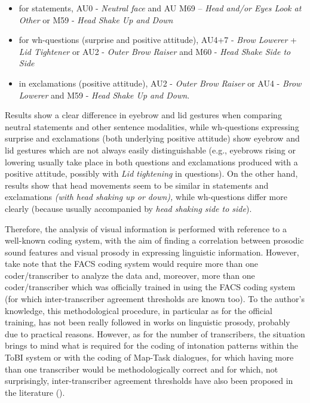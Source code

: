 \documentclass[output=paper]{langsci/langscibook}
\begin{document}
\begin{itemize}
\item  for statements, AU0 - \textit{Neutral face} and AU M69 – \textit{Head and\slash or Eyes Look at Other} or M59 - \textit{Head Shake Up and Down} 
\item  for wh-questions (surprise and positive attitude), AU4+7 - \textit{Brow Lowerer} + \textit{Lid Tightener} or AU2 - \textit{Outer Brow Raiser}  and M60 - \textit{Head Shake Side to Side} 
\item  in exclamations (positive attitude), AU2 - \textit{Outer Brow Raiser} or AU4 - \textit{Brow Lowerer} and M59 - \textit{Head Shake Up and Down}. 
\end{itemize}\largerpage

Results show a clear difference in eyebrow and lid gestures when comparing neutral statements and other sentence modalities, while wh-questions expressing surprise and exclamations (both underlying positive attitude) show eyebrow and lid gestures which are not always easily distinguishable (e.g., eyebrows rising or lowering usually take place in both questions and exclamations produced with a positive attitude, possibly with \textit{Lid tightening} in questions). On the other hand, results show that head movements seem to be similar in statements and exclamations \textit{(with head shaking up or down),} while wh-questions differ more clearly (because usually accompanied by \textit{head shaking side to side}). 

Therefore, the analysis of visual information is performed with reference to a well-known coding system, with the aim of finding a correlation between prosodic sound features and visual prosody in expressing linguistic information. However, take note that the FACS coding system would require more than one coder\slash transcriber to analyze the data and, moreover, more than one coder\slash transcriber which was officially trained in using the FACS coding system (for which inter-transcriber agreement thresholds are known too). To the author's knowledge, this methodological procedure, in particular as for the official training, has not been really followed in works on linguistic prosody, probably due to practical reasons. However, as for the number of transcribers, the situation brings to mind what is required for the coding of intonation patterns within the ToBI system or with the coding of Map-Task dialogues, for which having more than one transcriber would be methodologically correct and for which, not surprisingly, inter-transcriber agreement thresholds have also been proposed in the literature (\citealt{Silverman1992,Beckman1997,Isard.Carletta1995}). 
\end{document}
